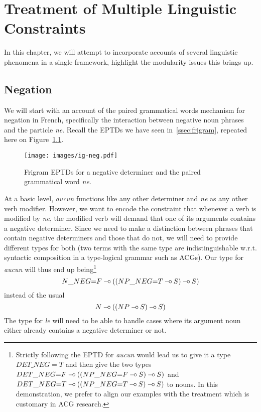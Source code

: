 \chapter{Treatment of Multiple Linguistic Constraints}
\label{chap:constraints}

In this chapter, we will attempt to incorporate accounts of several
linguistic phenomena in a single framework, highlight the modularity
issues this brings up.

\section{Negation}
\label{sec:negation}

We will start with an account of the paired grammatical words mechanism
for negation in French, specifically the interaction between negative
noun phrases and the particle \emph{ne}. Recall the EPTDs we have seen
in~\ref{ssec:frigram}, repeated here on Figure~\ref{fig:ig-neg-rep}.

\begin{figure}
  \centering
  \texttt{[image: images/ig-neg.pdf]}
  \caption{\label{fig:ig-neg-rep} Frigram EPTDs for a negative
    determiner and the paired grammatical word \emph{ne}.}
\end{figure}

At a basic level, \emph{aucun} functions like any other determiner and
\emph{ne} as any other verb modifier. However, we want to encode the
constraint that whenever a verb is modified by \emph{ne}, the modified
verb will demand that one of its arguments contains a negative
determiner. Since we need to make a distinction between phrases that
contain negative determiners and those that do not, we will need to
provide different types for both (two terms with the same type are
indistinguishable w.r.t. syntactic composition in a type-logical grammar
such as ACGs). Our type for \emph{aucun} will thus end up
being\footnote{Strictly following the EPTD for \emph{aucun} would lead
  us to give it a type $DET\_NEG{=}T$ and then give the two types
  $DET\_NEG{=}F \mathbin{{-}\mkern-3.5mu{\circ}} ((NP\_NEG{=}F \mathbin{{-}\mkern-3.5mu{\circ}} S) \mathbin{{-}\mkern-3.5mu{\circ}} S)$ and $DET\_NEG{=}T
  \mathbin{{-}\mkern-3.5mu{\circ}} ((NP\_NEG{=}T \mathbin{{-}\mkern-3.5mu{\circ}} S) \mathbin{{-}\mkern-3.5mu{\circ}} S)$ to nouns. In this
  demonstration, we prefer to align our examples with the treatment
  which is customary in ACG research.} $$N\_NEG{=}F \mathbin{{-}\mkern-3.5mu{\circ}} ((NP\_NEG{=}T
\mathbin{{-}\mkern-3.5mu{\circ}} S) \mathbin{{-}\mkern-3.5mu{\circ}} S)$$ instead of the usual $$N \mathbin{{-}\mkern-3.5mu{\circ}} ((NP \mathbin{{-}\mkern-3.5mu{\circ}} S) \mathbin{{-}\mkern-3.5mu{\circ}}
S)$$ The type for \emph{le} will need to be able to handle cases where
its argument noun either already contains a negative determiner or not.

